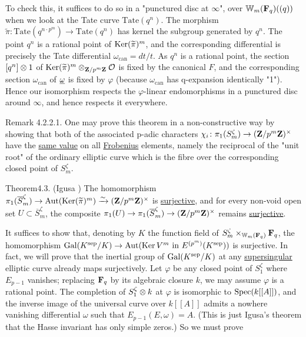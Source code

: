 \begin{kaproof}
To check this, it suffices to do so in a "punctured disc at $\infty$", over
$\mathbb{W}_m(\mathbf{F}_q)((q))$ when we look at the Tate curve $\mathrm{Tate}(q^n)$. The
morphism $\widetilde{\pi}\colon\mathrm{Tate}(q^{n\cdot p^m})\to\mathrm{Tate}(q^n)$
has kernel the subgroup generated by $q^n$. The point $q^n$ is a rational point
of $\operatorname{Ker}(\widetilde{\pi})^m$, and the corresponding differential is precisely
the Tate differential $\omega_{\mathrm{can}}=dt/t$. As $q^n$ is a rational
point, the section $[q^n]\otimes 1$ of
$\operatorname{Ker}(\widetilde{\pi})^m\otimes_{\mathbf{Z}/p^m\mathbf{Z}}\mathcal{O}$ is fixed by the canonical $F$, and
the corresponding section $\omega_{\mathrm{can}}$ of $\underline{\omega}$ is fixed by $\varphi$
(because $\omega_{\mathrm{can}}$ has q-expansion identically "1"). Hence our
isomorphism respects the $\varphi$-linear endomorphisms in a punctured disc
around $\infty$, and hence respects it everywhere.
\end{kaproof}

\begin{kathmstar}{Remark 4.2.2.1.}
One may prove this theorem in a non-constructive way by showing that both of the
associated p-adic characters $\chi_i\colon\pi_1(S_m^\zeta)\to(\mathbf{Z}/p^m\mathbf{Z})^\times$
have the \uline{same value} on all \uline{Frobenius} elements, namely the
reciprocal of the "unit root" of the ordinary elliptic curve which is the fibre
over the corresponding closed point of $S_m^\zeta$.
\end{kathmstar}


\begin{kathm}{Theorem}{4.3.}
(Igusa \cite{igusa68}) The homomorphism
$\pi_1(\overline{S}_m^\zeta)\to\operatorname{Aut}(\operatorname{Ker}(\widetilde{\pi})^m)\xrightarrow{\sim}
(\mathbf{Z}/p^m\mathbf{Z})^\times$ is \uline{surjective}, and for every non-void open set
$U\subset\overline{S}_m^\zeta$, the composite
$\pi_1(U)\to\pi_1(\overline{S}_m^\zeta)\to(\mathbf{Z}/p^m\mathbf{Z})^\times$ remains
\uline{surjective}.
\end{kathm}

\begin{kaproof}
It suffices to show that, denoting by $K$ the function field of
$S_m^\zeta\times_{\mathbb{W}_m(\mathbf{F}_q)}\mathbf{F}_q$, the homomorphism
$\operatorname{Gal}(K^{\mathrm{sep}}/K)\to\operatorname{Aut}(\operatorname{Ker} V^m \text{ in }E^{(p^m)}(K^{\mathrm{sep}}))$
is surjective. In fact, we will prove that the inertial group of
$\operatorname{Gal}(K^{\mathrm{sep}}/K)$ at any \uline{supersingular} elliptic curve already
maps surjectively. Let $\varphi$ be any closed point of $S_1^\zeta$ where
$E_{p-1}$ vanishes; replacing $\mathbf{F}_q$ by its algebraic closure $k$, we may assume
$\varphi$ is a rational point. The completion of $S_1^\zeta\otimes k$ at $\varphi$
is isomorphic to $\operatorname{Spec}(k[[A]])$, and the inverse image of the universal curve
over $k[[A]]$ admits a nowhere vanishing differential $\omega$ such that
$E_{p-1}(E,\omega)=A$. (This is just Igusa's theorem that the Hasse invariant
has only simple zeros.) So we must prove
\end{kaproof}

